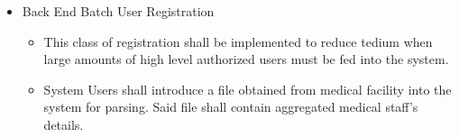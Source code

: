 \begin{itemize}
\begin{itemize}
		\item{Back End Batch User Registration}
		\begin{itemize}
			\item This class of registration shall be implemented to reduce tedium when large amounts of high level authorized users must be fed into the system.
			\item System Users shall introduce a file obtained from medical facility into the system for parsing. Said file shall contain aggregated medical staff's details.
		\end{itemize}
	\end{itemize}
\end{itemize}